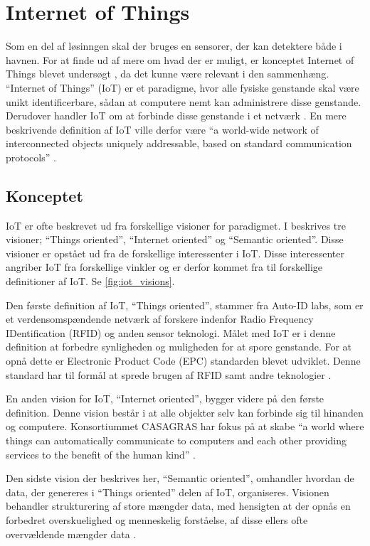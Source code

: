 \section{Internet of Things} %
\label{sec:internet_of_things}
Som en del af løsinngen skal der bruges en sensorer, der kan detektere både i havnen. For at finde ud af mere om hvad der er muligt, er konceptet Internet of Things blevet undersøgt , da det kunne være relevant i den sammenhæng. \enquote{Internet of Things} (IoT) er et paradigme, hvor alle fysiske genstande skal være unikt identificerbare, sådan at computere nemt kan administrere disse genstande. Derudover handler IoT om at forbinde disse genstande i et netværk \cite{kopetz2011real}. En mere beskrivende definition af IoT ville derfor være \enquote{a world-wide network of interconnected objects uniquely addressable, based on standard communication protocols} \cite{iot_survey_2010}.

\subsection{Konceptet}
\label{sub:iot_koncept}
IoT er ofte beskrevet ud fra forskellige visioner for paradigmet. I \cite{iot_survey_2010}  beskrives tre visioner; \enquote{Things oriented}, \enquote{Internet oriented} og \enquote{Semantic oriented}. Disse visioner er opstået ud fra de forskellige interessenter i IoT. Disse interessenter angriber IoT fra forskellige vinkler og er derfor kommet fra til forskellige definitioner af IoT. Se \cref{fig:iot_visions}.

Den første definition af IoT, \enquote{Things oriented}, stammer fra Auto-ID labs, som er et verdensomspændende netværk af forskere indenfor Radio Frequency IDentification (RFID) og anden sensor teknologi. Målet med IoT er i denne definition at forbedre synligheden og muligheden for at spore genstande. For at opnå dette er Electronic Product Code (EPC) standarden blevet udviklet. Denne standard har til formål at sprede brugen af RFID samt andre teknologier \cite{iot_survey_2010}.

En anden vision for IoT, \enquote{Internet oriented}, bygger videre på den første definition. Denne vision består i at alle objekter selv kan forbinde sig til hinanden og computere. Konsortiummet CASAGRAS har fokus på at skabe \enquote{a world where things can automatically communicate to computers and each other providing services to the benefit of the human kind} \cite{iot_survey_2010}.

Den sidste vision der beskrives her, \enquote{Semantic oriented}, omhandler hvordan de data, der genereres i \enquote{Things oriented} delen af IoT, organiseres. Visionen behandler strukturering af store mængder data, med hensigten at der opnås en forbedret overskuelighed og menneskelig forståelse, af disse ellers ofte overvældende mængder data \cite{iot_semantics_2012}.


